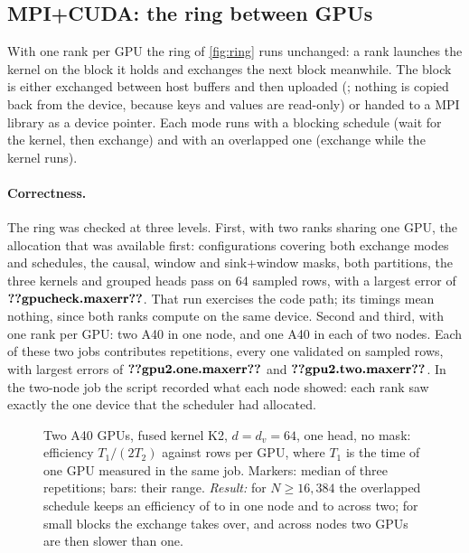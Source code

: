\subsection{MPI+CUDA: the ring between GPUs}\label{sec:gpuring}
With one rank per GPU the ring of \cref{fig:ring} runs unchanged: a rank launches
the kernel on the block it holds and exchanges the next block meanwhile. The block
is either exchanged between host buffers and then uploaded (;
nothing is copied back from the device, because keys and values are read-only) or
handed to a  MPI library as a device pointer. Each mode runs with
a blocking schedule (wait for the kernel, then exchange) and with an overlapped
one (exchange while the kernel runs).

\paragraph{Correctness.} The ring was checked at three levels. First, with two
ranks sharing one GPU, the allocation that was available first:
 configurations covering both exchange modes and
schedules, the causal, window and sink+window masks, both partitions, the three
kernels and grouped heads pass on 64 sampled rows, with a largest error of
$\n{gpucheck.maxerr}$. That run exercises the code path; its timings mean nothing,
since both ranks compute on the same device. Second and third, with one rank per
GPU: two A40 in one node, and one A40 in each of two nodes. Each of these two jobs
contributes  repetitions, every one validated on
 sampled rows, with largest errors of $\n{gpu2.one.maxerr}$ and
$\n{gpu2.two.maxerr}$. In the two-node job the script recorded what each node
showed: each rank saw exactly the one device that the scheduler had allocated.

\begin{figure}[t]
\centering
{}
\caption{Two A40 GPUs, fused kernel K2, $d=d_v=64$, one head, no mask: efficiency
$T_1/(2T_2)$ against rows per GPU, where $T_1$ is the time of one GPU measured in
the same job. Markers: median of three repetitions; bars: their range.
\emph{Result:} for $N\ge16{,}384$ the overlapped schedule keeps an efficiency of
 to  in one node and
 to  across two; for small
blocks the exchange takes over, and across nodes two GPUs are then slower than
one.}
\label{fig:gpuring}
\end{figure}

